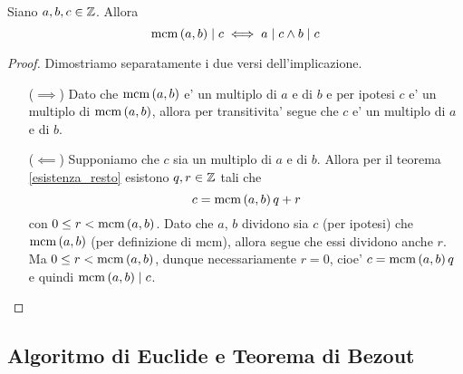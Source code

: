 \begin{proposition}\label{mcm|c_iff_a,b|c}
    Siano $a, b, c \in \mathbb{Z}$. Allora \begin{equation}
        \operatorname{mcm}\left(a, b\right) \mid c \iff a \mid c \land b \mid c
    \end{equation}
\end{proposition}
\begin{proof}
    Dimostriamo separatamente i due versi dell'implicazione.
    \begin{itemize}
        \item[($\implies$)] Dato che $\operatorname{mcm}\left(a, b\right)$ e' un multiplo di $a$ e di $b$ e per ipotesi $c$ e' un multiplo di $\operatorname{mcm}\left(a, b\right)$, allora per transitivita' segue che $c$ e' un multiplo di $a$ e di $b$.
        \item[($\impliedby$)] Supponiamo che $c$ sia un multiplo di $a$ e di $b$. Allora per il teorema \ref{esistenza_resto} esistono $q, r \in \mathbb{Z}$ tali che \[
        c = \operatorname{mcm}\left(a, b\right)q + r
    \]
    con $0 \leq r < \operatorname{mcm}\left(a, b\right)$.
    Dato che $a$, $b$ dividono sia $c$ (per ipotesi) che $\operatorname{mcm}\left(a, b\right)$ (per definizione di mcm), allora segue che essi dividono anche $r$. Ma $0 \leq r < \operatorname{mcm}\left(a, b\right)$, dunque necessariamente $r = 0$, cioe' $c = \operatorname{mcm}\left(a, b\right)q$ e quindi $\operatorname{mcm}\left(a, b\right) \mid c$. \qedhere
    \end{itemize}
\end{proof}


\subsection{Algoritmo di Euclide e Teorema di Bezout}

